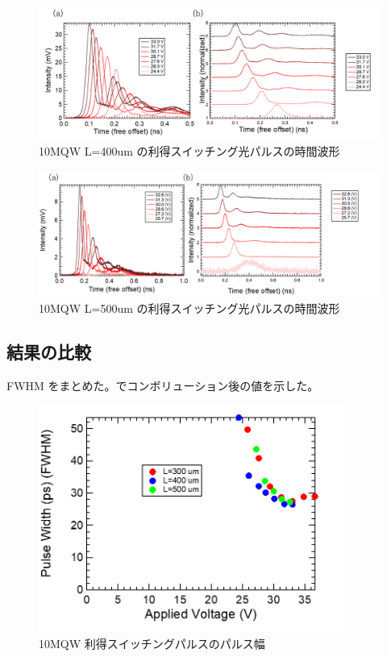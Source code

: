 {\begin{figure}[h]
	\centering
	\includegraphics[width=15cm]{figure/fig_3_2_10QW_ridge_L400_GS.png}
		\caption{10MQW L=400um の利得スイッチング光パルスの時間波形}
		\label{fig:fig_3_2_10QW_ridge_L400_GS}
\end{figure}
\begin{figure}[h]
	\centering
	\includegraphics[width=15cm]{figure/fig_3_2_10QW_ridge_L500_GS.png}
		\caption{10MQW L=500um の利得スイッチング光パルスの時間波形}
		\label{fig:fig_3_2_10QW_ridge_L500_GS}
\end{figure}
\clearpage
\subsection{結果の比較}%
FWHM をまとめた。でコンボリューション後の値を示した。
\begin{figure}[h]
	\centering
	\includegraphics[width=10cm]{figure/fig_3_2_10QW_ridge_GS_FWHM.png}
		\caption{10MQW 利得スイッチングパルスのパルス幅}
		\label{fig:fig_3_2_10QW_ridge_GS_FWHM}
\end{figure}

}
